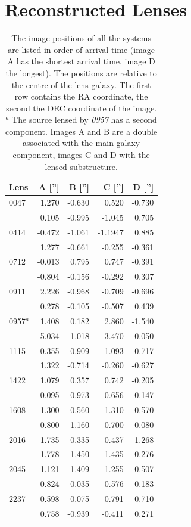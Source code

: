 \documentclass[useAMS,usenatbib]{mn2e}
\begin{document}
\section{Reconstructed Lenses}\label{sec:reconstructions}
\begin{table}
  \begin{center}
    \begin{tabular}{l r r r r}
      Lens & A [''] & B [''] & C [''] & D [''] \\ \hline
      0047 & 1.270 & -0.630 & 0.520 & -0.730 \\
           & 0.105 & -0.995 & -1.045 & 0.705 \\
      0414 & -0.472 & -1.061 & -1.1947 & 0.885 \\
           & 1.277 & -0.661 & -0.255 & -0.361 \\
      0712 & -0.013 & 0.795 & 0.747 & -0.391 \\
           & -0.804 & -0.156 & -0.292 & 0.307 \\
      0911 & 2.226 & -0.968 & -0.709 & -0.696 \\
           & 0.278 & -0.105 & -0.507 & 0.439 \\
      0957$^{a}$ & 1.408 & 0.182 & 2.860 & -1.540 \\
           & 5.034 & -1.018 & 3.470 & -0.050 \\
      1115 & 0.355 & -0.909 & -1.093 & 0.717 \\
           & 1.322 & -0.714 & -0.260 & -0.627 \\
      1422 & 1.079 & 0.357 & 0.742 & -0.205 \\
           & -0.095 & 0.973 & 0.656 & -0.147 \\
      1608 & -1.300 & -0.560 & -1.310 & 0.570 \\
           & -0.800 & 1.160 & 0.700 & -0.080 \\
      2016 & -1.735 & 0.335 & 0.437 & 1.268 \\
           & 1.778 & -1.450 & -1.435 & 0.276 \\
      2045 & 1.121 & 1.409 & 1.255 & -0.507 \\
           & 0.824 & 0.035 & 0.576 & -0.183 \\
      2237 & 0.598 & -0.075 & 0.791 & -0.710 \\
           & 0.758 & -0.939 & -0.411 & 0.271 \\
    \end{tabular}
    \caption[width=\linewidth]{The image positions of all the systems are listed in order of arrival time (image A has the shortest arrival time, image D the longest). The positions are relative to the centre of the lens galaxy. The first row contains the RA coordinate, the second the DEC coordinate of the image. \newline $^{a}$ The source lensed by {\it0957} has a second component. Images A and B are a double associated with the main galaxy component, images C and D with the lensed substructure.}
    \label{tab:lenspositions}
  \end{center}
\end{table}
\end{document}
